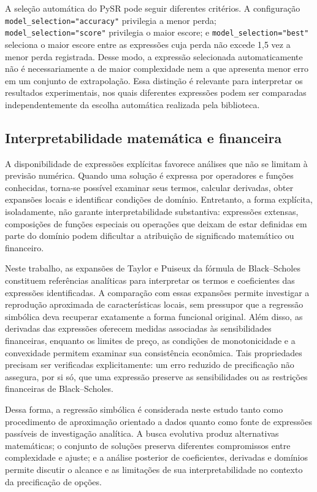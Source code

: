 A seleção automática do PySR pode seguir diferentes critérios. A configuração \texttt{model\_selection="accuracy"} privilegia a menor perda; \texttt{model\_selection="score"} privilegia o maior escore; e \texttt{model\_selection="best"} seleciona o maior escore entre as expressões cuja perda não excede 1,5 vez a menor perda registrada. Desse modo, a expressão selecionada automaticamente não é necessariamente a de maior complexidade nem a que apresenta menor erro em um conjunto de extrapolação. Essa distinção é relevante para interpretar os resultados experimentais, nos quais diferentes expressões podem ser comparadas independentemente da escolha automática realizada pela biblioteca.

\subsection{Interpretabilidade matemática e financeira}
\label{subsec:sr_interpretabilidade}

A disponibilidade de expressões explícitas favorece análises que não se limitam à previsão numérica. Quando uma solução é expressa por operadores e funções conhecidas, torna-se possível examinar seus termos, calcular derivadas, obter expansões locais e identificar condições de domínio. Entretanto, a forma explícita, isoladamente, não garante interpretabilidade substantiva: expressões extensas, composições de funções especiais ou operações que deixam de estar definidas em parte do domínio podem dificultar a atribuição de significado matemático ou financeiro.

Neste trabalho, as expansões de Taylor e Puiseux da fórmula de Black--Scholes constituem referências analíticas para interpretar os termos e coeficientes das expressões identificadas. A comparação com essas expansões permite investigar a reprodução aproximada de características locais, sem pressupor que a regressão simbólica deva recuperar exatamente a forma funcional original. Além disso, as derivadas das expressões oferecem medidas associadas às sensibilidades financeiras, enquanto os limites de preço, as condições de monotonicidade e a convexidade permitem examinar sua consistência econômica. Tais propriedades precisam ser verificadas explicitamente: um erro reduzido de precificação não assegura, por si só, que uma expressão preserve as sensibilidades ou as restrições financeiras de Black--Scholes.

Dessa forma, a regressão simbólica é considerada neste estudo tanto como procedimento de aproximação orientado a dados quanto como fonte de expressões passíveis de investigação analítica. A busca evolutiva produz alternativas matemáticas; o conjunto de soluções preserva diferentes compromissos entre complexidade e ajuste; e a análise posterior de coeficientes, derivadas e domínios permite discutir o alcance e as limitações de sua interpretabilidade no contexto da precificação de opções.